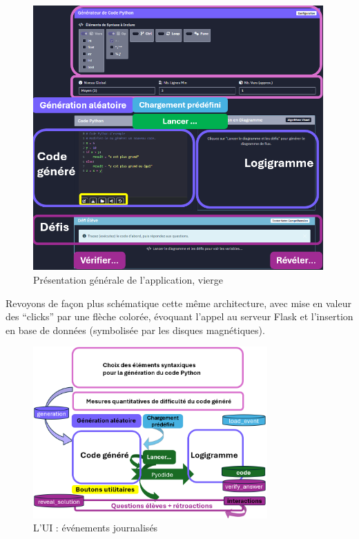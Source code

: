 \documentclass[11pt,a4paper]{article}
\begin{document}
\begin{figure}[H]
    \centering
    \includegraphics[width=0.99\textwidth, keepaspectratio]{UI_events_v2.png}
    \caption{Présentation générale de l'application, vierge}
    \label{fig:UI_events}
\end{figure}
Revoyons de façon plus schématique cette même architecture, avec mise en valeur des ``clicks'' par une flèche colorée, évoquant l'appel au serveur Flask et l'insertion en base de données (symbolisée par les disques magnétiques).
\begin{figure}[H]

    \centering
    \includegraphics[width=0.8\textwidth, keepaspectratio]{simplif_archi.png}
    \caption{L'UI : événements journalisés}
    \label{fig:simplif_archi}
\end{figure}
\end{document}

